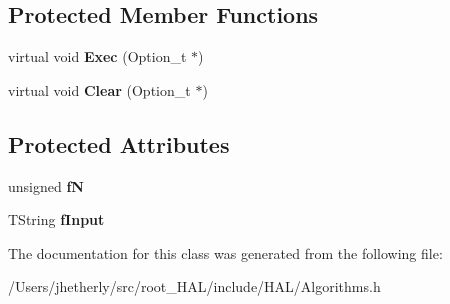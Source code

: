 \subsection*{Protected Member Functions}
\begin{DoxyCompactItemize}
\item 
\hypertarget{class_h_a_l_1_1internal_1_1_nth_element_algo_a1e86a01896c0779494c64388b6f5eaf7}{virtual void {\bfseries Exec} (Option\-\_\-t $\ast$)}\label{class_h_a_l_1_1internal_1_1_nth_element_algo_a1e86a01896c0779494c64388b6f5eaf7}

\item 
\hypertarget{class_h_a_l_1_1internal_1_1_nth_element_algo_ad8278ce22a46f271f9a0897662f32d5d}{virtual void {\bfseries Clear} (Option\-\_\-t $\ast$)}\label{class_h_a_l_1_1internal_1_1_nth_element_algo_ad8278ce22a46f271f9a0897662f32d5d}

\end{DoxyCompactItemize}
\subsection*{Protected Attributes}
\begin{DoxyCompactItemize}
\item 
\hypertarget{class_h_a_l_1_1internal_1_1_nth_element_algo_a3a92b1515c0f855d1338a1e58b927ea8}{unsigned {\bfseries f\-N}}\label{class_h_a_l_1_1internal_1_1_nth_element_algo_a3a92b1515c0f855d1338a1e58b927ea8}

\item 
\hypertarget{class_h_a_l_1_1internal_1_1_nth_element_algo_a8962683bef336bdd1c606e852ad40099}{T\-String {\bfseries f\-Input}}\label{class_h_a_l_1_1internal_1_1_nth_element_algo_a8962683bef336bdd1c606e852ad40099}

\end{DoxyCompactItemize}


The documentation for this class was generated from the following file\-:\begin{DoxyCompactItemize}
\item 
/\-Users/jhetherly/src/root\-\_\-\-H\-A\-L/include/\-H\-A\-L/Algorithms.\-h\end{DoxyCompactItemize}
